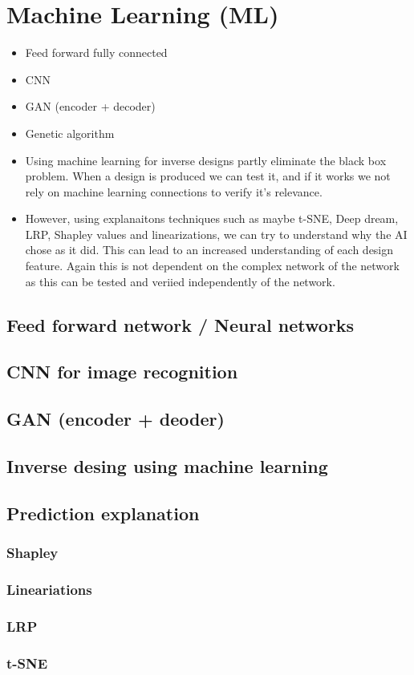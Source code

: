 \section{Machine Learning (ML)}
\begin{itemize}
  \item Feed forward fully connected
  \item CNN
  \item GAN (encoder + decoder)
  \item Genetic algorithm
  \item Using machine learning for inverse designs partly eliminate the black
  box problem. When a design is produced we can test it, and if it works we not
  rely on machine learning connections to verify it's relevance. 
  \item However, using explanaitons techniques such as maybe t-SNE, Deep dream,
  LRP, Shapley values and linearizations, we can try to understand why the AI
  chose as it did. This can lead to an increased understanding of each design
  feature. Again this is not dependent on the complex network of the network as
  this can be tested and veriied independently of the network. 
\end{itemize}

\subsection{Feed forward network / Neural networks}
\subsection{CNN for image recognition}
\subsection{GAN (encoder + deoder)}
\subsection{Inverse desing using machine learning}
\subsection{Prediction explanation}
\subsubsection{Shapley}
\subsubsection{Lineariations}
\subsubsection{LRP}
\subsubsection{t-SNE}



